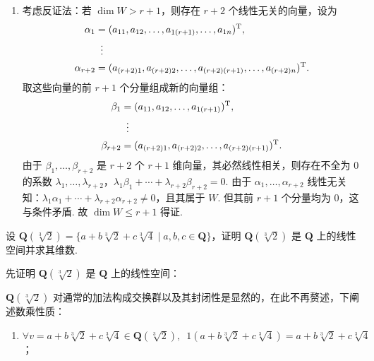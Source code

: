 \begin{exercise}
\begin{exgroup}
\begin{answer}
\begin{enumerate}
                \item 考虑反证法：若 $\dim W>r+1$，则存在 $r+2$ 个线性无关的向量，设为
                      \begin{align*}
                          \alpha_1     & = (a_{11},a_{12},\ldots,a_{1(r+1)},\ldots,a_{1n})^{\mathrm{T}},                 \\
                                       & \vdotswithin{ = }                                                              \\
                          \alpha_{r+2} & = (a_{(r+2)1},a_{(r+2)2},\ldots,a_{(r+2)(r+1)},\ldots,a_{(r+2)n})^{\mathrm{T}}.
                      \end{align*}
                      取这些向量的前 $r+1$ 个分量组成新的向量组：
                      \begin{align*}
                          \beta_1     & = (a_{11},a_{12},\ldots,a_{1(r+1)})^{\mathrm{T}},             \\
                                      & \vdotswithin{ = }                                            \\
                          \beta_{r+2} & = (a_{(r+2)1},a_{(r+2)2},\ldots,a_{(r+2)(r+1)})^{\mathrm{T}}.
                      \end{align*}
                      由于 $\beta_1,\ldots,\beta_{r+2}$ 是 $r+2$ 个 $r+1$ 维向量，其必然线性相关，则存在不全为 0 的系数 $\lambda_1,\ldots,\lambda_{r+2}$，$\lambda_1\beta_1+\cdots+\lambda_{r+2}\beta_{r+2}=0$.  由于 $\alpha_1,\ldots,\alpha_{r+2}$ 线性无关知：$\lambda_1\alpha_1+\cdots+\lambda_{r+2}\alpha_{r+2}\neq 0$，且其属于 $W$. 但其前 $r+1$ 个分量均为 0，这与条件矛盾. 故 $\dim W\leqslant r+1$ 得证.
            \end{enumerate}
        \end{answer}

        \item 设 $\mathbf{Q}(\sqrt[3]{2}) = \{a+b\sqrt[3]{2}+c\sqrt[3]{4}\mid a,b,c\in\mathbf{Q}\}$，证明 $\mathbf{Q}(\sqrt[3]{2})$ 是 $\mathbf{Q}$ 上的线性空间并求其维数.
        \begin{answer}
            先证明 $\mathbf{Q}(\sqrt[3]{2})$ 是 $\mathbf{Q}$ 上的线性空间：

            $\mathbf{Q}(\sqrt[3]{2})$ 对通常的加法构成交换群以及其封闭性是显然的，在此不再赘述，下阐述数乘性质：
            \begin{enumerate}
                \item $\forall v = a+b\sqrt[3]{2}+c\sqrt[3]{4} \in \mathbf{Q}(\sqrt[3]{2}), \enspace 1 (a+b\sqrt[3]{2}+c\sqrt[3]{4}) = a+b\sqrt[3]{2}+c\sqrt[3]{4}$；


\end{enumerate}
\end{answer}
\end{exgroup}
\end{exercise}
